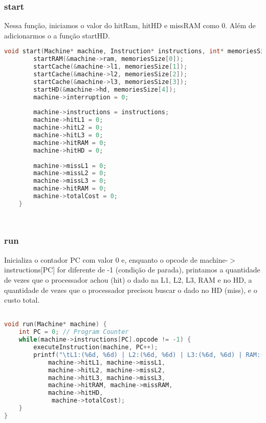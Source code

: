 \documentclass{article}
\begin{document}
\subsubsection{start}

Nessa função, iniciamos o valor do hitRam, hitHD e missRAM como 0. Além de adicionarmos o a função startHD.

\begin{lstlisting}[caption={Funçao run},label={lst:cod3},language=C]
    void start(Machine* machine, Instruction* instructions, int* memoriesSize) {
        startRAM(&machine->ram, memoriesSize[0]);
        startCache(&machine->l1, memoriesSize[1]);
        startCache(&machine->l2, memoriesSize[2]);
        startCache(&machine->l3, memoriesSize[3]);
        startHD(&machine->hd, memoriesSize[4]);
        machine->interruption = 0;
    
        machine->instructions = instructions;
        machine->hitL1 = 0;
        machine->hitL2 = 0;
        machine->hitL3 = 0;
        machine->hitRAM = 0;
        machine->hitHD = 0;
    
        machine->missL1 = 0;
        machine->missL2 = 0;
        machine->missL3 = 0;
        machine->hitRAM = 0;
        machine->totalCost = 0;
    }
        
        
\end{lstlisting}

\subsubsection{run}

Inicializa o contador PC com valor 0 e, enquanto o opcode de machine-$>$instructions[PC] for diferente de -1 (condição de parada), printamos a quantidade de vezes que o processador achou (hit) o dado na L1, L2, L3, RAM e no HD, a quantidade de vezes que o processador precisou buscar o dado no HD (miss), e o custo total.

\begin{lstlisting}[caption={Funçao run},label={lst:cod3},language=C]

void run(Machine* machine) {    
    int PC = 0; // Program Counter
    while(machine->instructions[PC].opcode != -1) {
        executeInstruction(machine, PC++);
        printf("\tL1:(%6d, %6d) | L2:(%6d, %6d) | L3:(%6d, %6d) | RAM:(%6d, %6d) | HD:(%6d) | COST: %d\n", 
            machine->hitL1, machine->missL1, 
            machine->hitL2, machine->missL2,
            machine->hitL3, machine->missL3,
            machine->hitRAM, machine->missRAM,
            machine->hitHD,
             machine->totalCost);
    }
}
    
    
\end{lstlisting}
\end{document}
